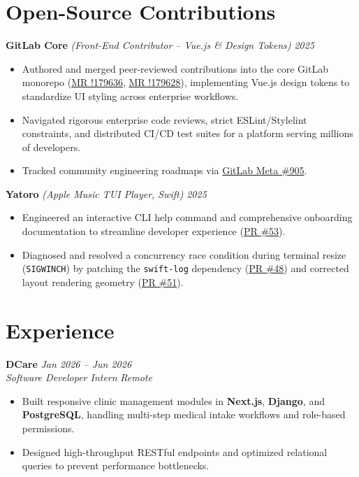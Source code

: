 \documentclass[10pt,a4paper]{article}
\begin{document}
\section{Open-Source Contributions}
\textbf{GitLab Core} \textit{(Front-End Contributor -- Vue.js \& Design Tokens)} \hfill \textit{2025}
\begin{itemize}
    \item Authored and merged peer-reviewed contributions into the core GitLab monorepo (\href{https://gitlab.com/gitlab-org/gitlab/-/merge_requests/179636}{MR !179636}, \href{https://gitlab.com/gitlab-org/gitlab/-/merge_requests/179628}{MR !179628}), implementing Vue.js design tokens to standardize UI styling across enterprise workflows.
    \item Navigated rigorous enterprise code reviews, strict ESLint/Stylelint constraints, and distributed CI/CD test suites for a platform serving millions of developers.
    \item Tracked community engineering roadmaps via \href{https://gitlab.com/gitlab-community/meta/-/work_items/905}{GitLab Meta \#905}.
\end{itemize}

\textbf{Yatoro} \textit{(Apple Music TUI Player, Swift)} \hfill \textit{2025}
\begin{itemize}
    \item Engineered an interactive CLI help command and comprehensive onboarding documentation to streamline developer experience (\href{https://github.com/jayadamsmorgan/Yatoro/pull/53}{PR \#53}).
    \item Diagnosed and resolved a concurrency race condition during terminal resize (\texttt{SIGWINCH}) by patching the \texttt{swift-log} dependency (\href{https://github.com/jayadamsmorgan/Yatoro/pull/48}{PR \#48}) and corrected layout rendering geometry (\href{https://github.com/jayadamsmorgan/Yatoro/pull/51}{PR \#51}).
\end{itemize}

\section{Experience}
\textbf{DCare} \hfill \textit{Jan 2026 -- Jun 2026} \\
\textit{Software Developer Intern} \hfill \textit{Remote}
\begin{itemize}
    \item Built responsive clinic management modules in \textbf{Next.js}, \textbf{Django}, and \textbf{PostgreSQL}, handling multi-step medical intake workflows and role-based permissions.
    \item Designed high-throughput RESTful endpoints and optimized relational queries to prevent performance bottlenecks.
\end{itemize}
\end{document}
